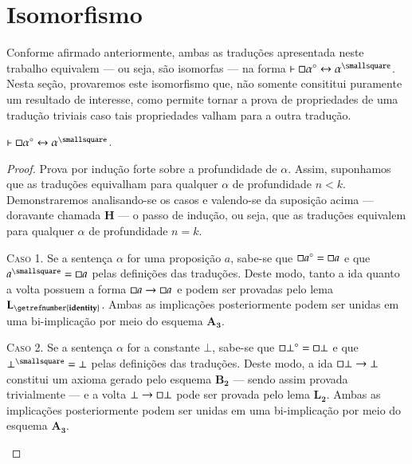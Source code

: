 \section{Isomorfismo}

Conforme afirmado anteriormente, ambas as traduções apresentada neste trabalho equivalem --- ou seja, são isomorfas --- na forma $\entails\nec\alpha^\circ\leftrightarrow\alpha^\smallsquare$. Nesta seção, provaremos este isomorfismo que, não somente consititui puramente um resultado de interesse, como permite tornar a prova de propriedades de uma tradução triviais caso tais propriedades valham para a outra tradução.

\begin{theorem}
    $\entails\nec\alpha^\circ\leftrightarrow\alpha^\smallsquare$.

    \begin{proof}
        Prova por indução forte sobre a profundidade de $\alpha$.
        Assim, suponhamos que as traduções equivalham para qualquer $\alpha$ de profundidade $n<k$.
        Demonstraremos analisando-se os casos e valendo-se da suposição acima --- doravante chamada $\mathbf{H}$ --- o passo de indução, ou seja, que as traduções equivalem para qualquer $\alpha$ de profundidade $n=k$.

        \begin{case}
            \textsc{Caso 1.}
            Se a sentença $\alpha$ for uma proposição $a$, sabe-se que $\mathord{\square} a^\circ=\mathord{\square} a$ e que $a^\smallsquare=\nec a$ pelas definições das traduções.
            Deste modo, tanto a ida quanto a volta possuem a forma $\mathord{\square} a\to\mathord{\square} a$ e podem ser provadas pelo lema \hyperref[identity]{$\mathbf{L_\getrefnumber{identity}}$}.
            Ambas as implicações posteriormente podem ser unidas em uma bi-implicação por meio do esquema \hyperref[MA3]{$\mathbf{A_3}$}.
        \end{case}

        \begin{case}
            \textsc{Caso 2.}
            Se a sentença $\alpha$ for a constante $\bot$, sabe-se que $\mathord{\square}\bot^\circ=\mathord{\square}\bot$ e que $\bot^\smallsquare=\bot$ pelas definições das traduções.
            Deste modo, a ida $\mathord{\square}\bot\to\bot$ constitui um axioma gerado pelo esquema \hyperref[MB2]{$\mathbf{B_2}$} --- sendo assim provada trivialmente --- e a volta $\bot\to\mathord{\square}\bot$ pode ser provada pelo lema \hyperref[explosion]{$\mathbf{L_2}$}.
            Ambas as implicações posteriormente podem ser unidas em uma bi-implicação por meio do esquema \hyperref[MA3]{$\mathbf{A_3}$}.
        \end{case}


\end{proof}
\end{theorem}
